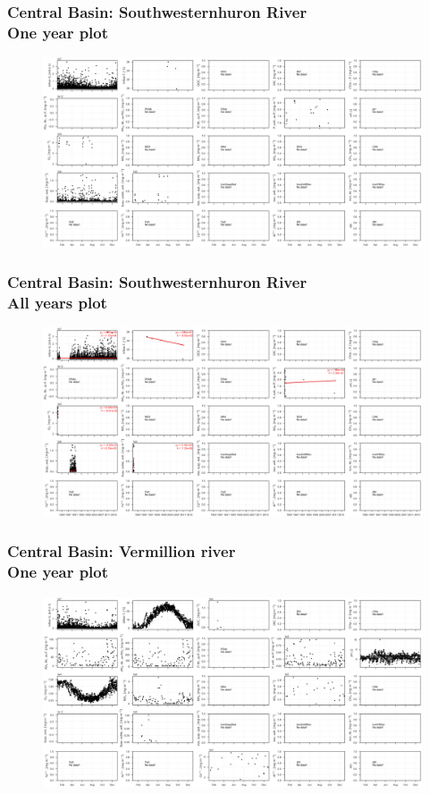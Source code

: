 \documentclass{beamer}
\begin{document}
\begin{frame}
\frametitle{Central Basin: Southwesternhuron River\\ One year plot}
\begin{figure}
\includegraphics[width=\textwidth]{rivers/Central basin/plot_1yr southwesternhuronriver.png}
\end{figure}
\end{frame}

\begin{frame}
\frametitle{Central Basin: Southwesternhuron River\\ All years plot}
\begin{figure}
\includegraphics[width=\textwidth]{rivers/Central basin/plot_all southwesternhuronriver.png}
\end{figure}
\end{frame}

\begin{frame}
\frametitle{Central Basin: Vermillion river\\ One year plot}
\begin{figure}
\includegraphics[width=\textwidth]{rivers/Central basin/plot_1yr vermillion.png}
\end{figure}
\end{frame}
\end{document}
